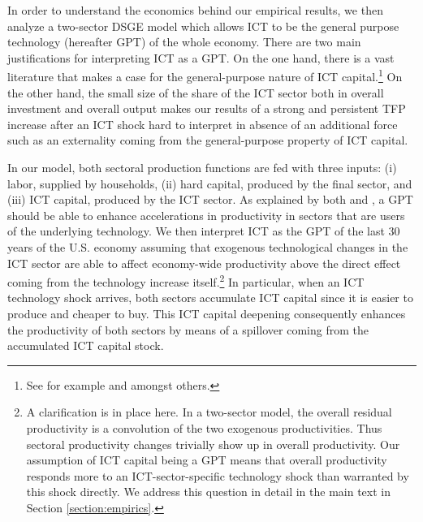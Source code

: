 \documentclass[12pt]{article}
\begin{document}
In order to understand the economics behind our empirical results, we then analyze a two-sector DSGE model which allows ICT to be the general purpose technology (hereafter GPT) of the whole economy. There are two main justifications for interpreting ICT as a GPT. On the one hand, there is a vast literature that makes a case for the general-purpose nature of ICT capital.\footnote{See for example \cite{oliner2000resurgence} and \cite{stiroh2002information} amongst others.} On the other hand, the small size of the share of the ICT sector both in overall investment and overall output makes our results of a strong and persistent TFP increase after an ICT shock hard to interpret in absence of an additional force such as an externality coming from the general-purpose property of ICT capital.

In our model, both sectoral production functions are fed with three inputs: (i) labor, supplied by households, (ii) hard capital, produced by the final sector, and (iii) ICT capital, produced by the ICT sector. As explained by both \cite{basu2003case} and \cite{basu2007information}, a GPT should be able to enhance accelerations in productivity in sectors that are users of the underlying technology. We then interpret ICT as the GPT of the last 30 years of the U.S. economy assuming that exogenous technological changes in the ICT sector are able to affect economy-wide productivity above the direct effect coming from the technology increase itself.\footnote{A clarification is in place here. In a two-sector model, the overall residual productivity is a convolution of the two exogenous productivities. Thus sectoral productivity changes trivially show up in overall productivity. Our assumption of ICT capital being a GPT means that overall productivity responds more to an ICT-sector-specific technology shock than warranted by this shock directly. We address this question in detail in the main text in Section \ref{section:empirics}.} In particular, when an ICT technology shock arrives, both sectors accumulate ICT capital since it is easier to produce and cheaper to buy. This ICT capital deepening consequently enhances the productivity of both sectors by means of a spillover coming from the accumulated ICT capital stock. 
\end{document}
